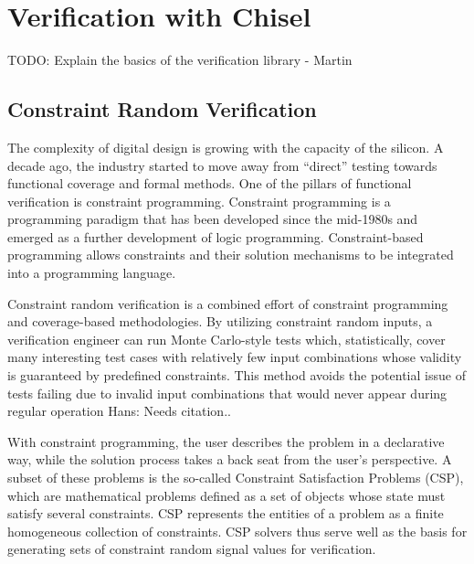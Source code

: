 \documentclass[conference]{IEEEtran}
\newcommand{\todo}[1]{{\color{olive} TODO: #1}}
\newcommand{\hjd}[1]{{\color{pink} Hans: #1}}
\begin{document}
\section{Verification with Chisel}

\todo{Explain the basics of the verification library - Martin}

\subsection{Constraint Random Verification}
The complexity of digital design is growing with the capacity of the silicon. A decade ago, the industry started to move away from ``direct'' testing towards functional coverage and formal methods. One of the pillars of functional verification is constraint programming. Constraint programming is a programming paradigm that has been developed since the mid-1980s and emerged as a further development of logic programming. Constraint-based programming allows constraints and their solution mechanisms to be integrated into a programming language.

Constraint random verification is a combined effort of constraint programming and coverage-based methodologies. By utilizing constraint random inputs, a verification engineer can run Monte Carlo-style tests which, statistically, cover many interesting test cases with relatively few input combinations whose validity is guaranteed by predefined constraints. This method avoids the potential issue of tests failing due to invalid input combinations that would never appear during regular operation \hjd{Needs citation.}.

With constraint programming, the user describes the problem in a declarative way, while the solution process takes a back seat from the user's perspective. A subset of these problems is the so-called Constraint Satisfaction Problems (CSP), which are mathematical problems defined as a set of objects whose state must satisfy several constraints. CSP represents the entities of a problem as a finite homogeneous collection of constraints. CSP solvers thus serve well as the basis for generating sets of constraint random signal values for verification.

%
\end{document}
